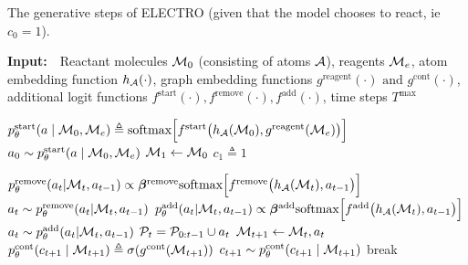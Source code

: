 \begin{algorithm}[t]
  \caption{The generative steps of ELECTRO (given that the model chooses to react, ie $c_0=1$).}
  {\bf Input:}~~Reactant molecules ${\mathcal{M}}_0$ (consisting of atoms ${\mathcal{A}}$), reagents ${\mathcal{M}}_e$, atom embedding function $h_{{\mathcal{A}}}(\cdot)$, graph embedding functions $g^\mathrm{reagent}(\cdot) \textrm{ and } g^\mathrm{cont}(\cdot)$, additional logit functions $f^\mathrm{start}(\cdot),f^\mathrm{remove}(\cdot),f^\mathrm{add}(\cdot)$, time steps $T^\mathrm{max}$
  
  \begin{algorithmic}[1]
  	\STATE $p_\theta^{\mathrm{start}}(a \mid {\mathcal{M}}_0, {\mathcal{M}}_e) \triangleq \mbox{softmax}\Big[f^{\mathrm{start}}\big(h_{{\mathcal{A}}}({\mathcal{M}}_0), g^\mathrm{reagent}({\mathcal{M}}_e)\big)\Big]$ 
  	\STATE $a_{0} \sim p_\theta^{\mathrm{start}}(a \mid {\mathcal{M}}_0, {\mathcal{M}}_e)$
  	\STATE ${\mathcal{M}}_{1} \leftarrow {\mathcal{M}}_{0}$ 
  	  \STATE $c_1 \triangleq 1 $ 

  			\STATE $p_\theta^{\mathrm{remove}}(a_t | {\mathcal{M}}_t, a_{t-1}) \propto \bm{\beta}^\textrm{remove} \mbox{softmax}\Big[f^{\mathrm{remove}}\big(h_{{\mathcal{A}}}({\mathcal{M}}_t), a_{t-1}\big)\Big]$ 
  			\STATE $a_t \sim p_\theta^{\mathrm{remove}}(a_t | {\mathcal{M}}_t, a_{t-1})$ 
  		\ELSE
  		  	\STATE $p_\theta^{\mathrm{add}}(a_t | {\mathcal{M}}_t, a_{t-1}) \propto \bm{\beta}^\textrm{add} \mbox{softmax}\Big[f^{\mathrm{add}}\big(h_{{\mathcal{A}}}({\mathcal{M}}_t), a_{t-1}\big)\Big]$
  			\STATE  $a_t \sim p_\theta^{\mathrm{add}}(a_t | {\mathcal{M}}_t, a_{t-1})$ 
  		\ENDIF
  		\STATE ${\mathcal{P}}_t = {\mathcal{P}}_{0:t-1} \cup a_t$
  		\STATE ${\mathcal{M}}_{t+1} \leftarrow {\mathcal{M}}_{t}, a_{t}$ 
  		\STATE $p_\theta^{\textrm{cont}}(c_{t+1} \mid {\mathcal{M}}_{t+1}) \triangleq \sigma(g^{\textrm{cont}}( {\mathcal{M}}_{t+1}))$
  		\STATE $c_{t+1} \sim p_\theta^{\textrm{cont}}(c_{t+1} \mid {\mathcal{M}}_{t+1})$ 
  			\STATE break
  		\ENDIF
  	\ENDFOR
  	

\end{algorithmic}
\end{algorithm}
